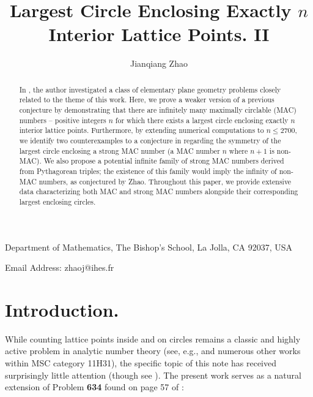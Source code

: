 \documentclass{article}
\theoremstyle{theorem}
\theoremstyle{definition}
\begin{document}
\title{Largest Circle Enclosing Exactly $n$ Interior Lattice Points. II}
\date{}

\author{Jianqiang Zhao}  


\maketitle

\begin{center}
Department of Mathematics, The Bishop's School, La Jolla, CA 92037, USA

Email Address: zhaoj@ihes.fr
\end{center}

\begin{abstract}
In \cite{Zhao2025Aug}, the author investigated a class of elementary plane geometry problems closely related to the theme of this work. Here, we prove a weaker version of a previous conjecture by demonstrating that there are infinitely many maximally circlable (MAC) numbers -- positive integers $n$ for which there exists a largest circle enclosing exactly $n$ interior lattice points. Furthermore, by extending numerical computations to $n \le 2700$, we identify two counterexamples to a conjecture in \cite{Zhao2025Aug} regarding the symmetry of the largest circle enclosing a strong MAC number (a MAC number $n$ where $n+1$ is non-MAC). We also propose a potential infinite family of strong MAC numbers derived from Pythagorean triples; the existence of this family would imply the infinity of non-MAC numbers, as conjectured by Zhao. Throughout this paper, we provide extensive data characterizing both MAC and strong MAC numbers alongside their corresponding largest enclosing circles.
\end{abstract}

\vspace{10px}


\vspace{10px}


\section{Introduction.}\label{sec:intro}
While counting lattice points inside and on circles remains a classic and highly active problem in analytic number theory (see, e.g., \cite{Hua1942, Huxley} and numerous other works within MSC category 11H31), the specific topic of this note has received surprisingly little attention (though see \cite{Honsberger1973, Schinzel1958, Sierpinski1959, Steinhaus1964}). The present work serves as a natural extension of Problem \textbf{634} found on page 57 of \cite{exeter2017}:
\end{document}
